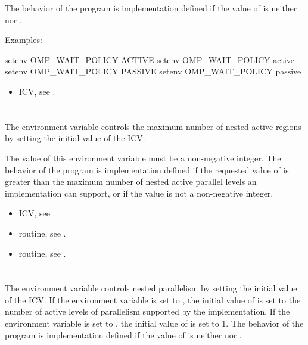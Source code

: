 The behavior of the program is implementation defined if the value of
 is neither  nor .

Examples:
\begin{ompEnv}
setenv OMP_WAIT_POLICY ACTIVE
setenv OMP_WAIT_POLICY active
setenv OMP_WAIT_POLICY PASSIVE
setenv OMP_WAIT_POLICY passive
\end{ompEnv}

\crossreferences
\begin{itemize}
\item {} ICV, see .
\end{itemize}



\section{}
\label{sec:OMP_MAX_ACTIVE_LEVELS}
The  environment variable controls the maximum number
of nested active  regions by setting the initial value of the
 ICV.

The value of this environment variable must be a non-negative integer. The
behavior of the program is implementation defined if the requested value of
 is greater than the maximum number of nested
active parallel levels an implementation can support, or if the value is not a
non-negative integer.

\crossreferences
\begin{itemize}
\item {} ICV, see .

\item {} routine, 
see .

\item {} routine, 
see .
\end{itemize}



\section{}
\label{sec:OMP_NESTED}
The  environment variable controls nested parallelism by
setting the initial value of the  ICV. If the
environment variable is set to , the initial value of
 is set to the number of active levels of
parallelism supported by the implementation. If the environment variable is
set to , the initial value of 
is set to 1. The behavior of the program is implementation defined if the
value of  is neither  nor .


